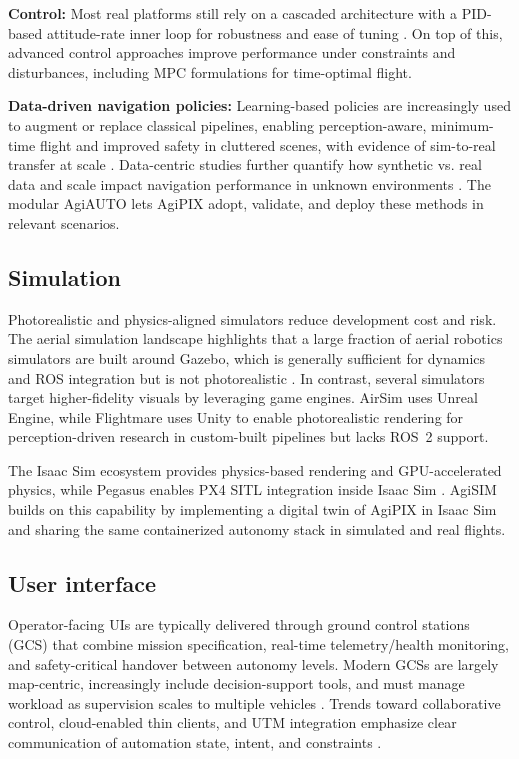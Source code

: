 \documentclass[letterpaper, 10 pt, conference]{ieeeconf}  %
\newcommand{\Agipixs}{AgiPIX }
\newcommand{\Agiautonomys}{AgiAUTO }
\newcommand{\Agisims}{AgiSIM }
\begin{document}
\textbf{Control:} Most real platforms still rely on a cascaded architecture with a PID-based attitude-rate inner loop for robustness and ease of tuning \cite{meier2015px4}. On top of this, advanced control approaches improve performance under constraints and disturbances, including MPC formulations \cite{lu2022onmpc} for time-optimal flight.

\textbf{Data-driven navigation policies:} Learning-based policies are increasingly used to augment or replace classical pipelines, enabling perception-aware, minimum-time flight and improved safety in cluttered scenes, with evidence of sim-to-real transfer at scale \cite{song2023perceptionaware,xu2025navrl}. Data-centric studies further quantify how synthetic vs. real data and scale impact navigation performance in unknown environments \cite{suomela2025synthetic,suomela2026data}. The modular \Agiautonomys lets \Agipixs adopt, validate, and deploy these methods in relevant scenarios.

\subsection{Simulation}\label{subsec:related.sim}
Photorealistic and physics-aligned simulators reduce development cost and risk. The aerial simulation landscape highlights that a large fraction of aerial robotics simulators are built around Gazebo, which is generally sufficient for dynamics and ROS integration but is not photorealistic \cite{furrer2016rotors}. In contrast, several simulators target higher-fidelity visuals by leveraging game engines. AirSim \cite{shah2017airsim} uses Unreal Engine, while Flightmare \cite{song2021flightmare} uses Unity to enable photorealistic rendering for perception-driven research in custom-built pipelines but lacks ROS~2 support.

The Isaac Sim ecosystem provides physics-based rendering and GPU-accelerated physics, while Pegasus enables PX4 SITL integration inside Isaac Sim \cite{jacinto2024pegasus}. \Agisims builds on this capability by implementing a digital twin of \Agipixs in Isaac Sim and sharing the same containerized autonomy stack in simulated and real flights.


\subsection{User interface}\label{subsec:related.ui}
Operator-facing UIs are typically delivered through ground control stations (GCS) that combine mission specification, real-time telemetry/health monitoring, and safety-critical handover between autonomy levels. Modern GCSs are largely map-centric, increasingly include decision-support tools, and must manage workload as supervision scales to multiple vehicles \cite{Zhang2024InterfaceWorkload}. Trends toward collaborative control, cloud-enabled thin clients, and UTM integration emphasize clear communication of automation state, intent, and constraints \cite{DiGregorio2021HumanGCS}.
\end{document}
